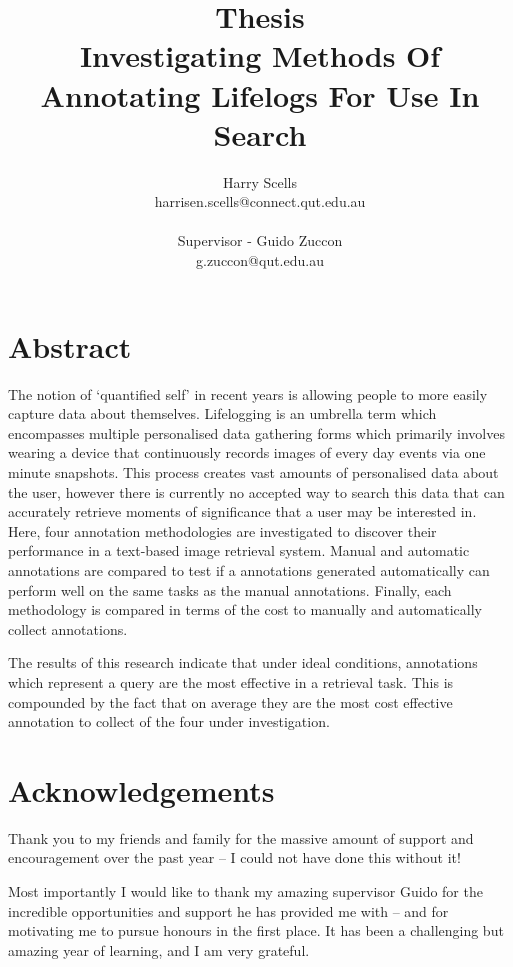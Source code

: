 \documentclass[12pt,a4paper]{book}
\begin{document}
\title{\small Thesis\\\huge Investigating Methods Of Annotating Lifelogs For Use In Search}

\author{Harry Scells\\harrisen.scells@connect.qut.edu.au\\\\\small Supervisor - Guido Zuccon\\\small g.zuccon@qut.edu.au\\}
\maketitle

\chapter*{Abstract}
The notion of `quantified self' in recent years is allowing people to more easily capture data about themselves. Lifelogging is an umbrella term which encompasses multiple personalised data gathering forms which primarily involves wearing a device that continuously records images of every day events via one minute snapshots. This process creates vast amounts of personalised data about the user, however there is currently no accepted way to search this data that can accurately retrieve moments of significance that a user may be interested in. Here, four annotation methodologies are investigated to discover their performance in a text-based image retrieval system. Manual and automatic annotations are compared to test if a annotations generated automatically can perform well on the same tasks as the manual annotations. Finally, each methodology is compared in terms of the cost to manually and automatically collect annotations.

The results of this research indicate that under ideal conditions, annotations which represent a query are the most effective in a retrieval task. This is compounded by the fact that on average they are the most cost effective annotation to collect of the four under investigation.

\chapter*{Acknowledgements}
Thank you to my friends and family for the massive amount of support and encouragement over the past year -- I could not have done this without it!

Most importantly I would like to thank my amazing supervisor Guido for the incredible opportunities and support he has provided me with -- and for motivating me to pursue honours in the first place. It has been a challenging but amazing year of learning, and I am very grateful.
\end{document}
